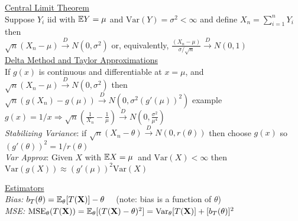 \documentclass[11pt]{article}
\newcommand{\Var}{\ensuremath{\mathrm{Var}}}
\newcommand{\Exp}{\Bbb{E}}
\begin{document}
\indent \underline{Central Limit Theorem}\\
\enlargethispage*{1000pt}
Suppose $Y_i$  iid with $\Exp Y = \mu$ and $\Var(Y) = \sigma^2 < \infty$ and define $X_n =
\sum_{i=1}^n Y_i$ then \\
%
$\sqrt{n}(X_n - \mu)\stackrel{D}{\longrightarrow} N(0,\sigma^2)$ or, equivalently,
$\frac{(X_n - \mu)}{\sigma /\sqrt{n}}\stackrel{D}{\longrightarrow} N(0,1)$  \\
%
\newpage
\indent\underline{Delta Method and Taylor Approximations}\\
If $g(x)$ is continuous and differentiable at $x=\mu$, and $\sqrt{n}(X_n - \mu)
\stackrel{D}{\longrightarrow} N(0,\sigma^2)$ then\\
%
$\sqrt{n}(g(X_n) - g(\mu))
\stackrel{D}{\longrightarrow} N(0,\sigma^2(g'(\mu))^2)$  example $g(x) = 1/x \Rightarrow
\sqrt{n}(\frac{1}{X_n} - \frac{1}{\mu})
\stackrel{D}{\longrightarrow} N(0,\frac{\sigma^2}{\mu^4})$\\
%
{\it Stabilizing Variance}: if $\sqrt{n}(X_n - \theta)
\stackrel{D}{\longrightarrow} N(0,r(\theta))$ then choose $g(x)$ so $(g'(\theta))^2 =
1/r(\theta)$\\
%
{\it Var Approx}:  Given $X$ with $\Exp X=\mu$\ and $\Var(X)<\infty$ then
$\Var(g(X))\approx (g'(\mu))^2 \Var(X)$

\indent\underline{Estimators}\\
{\it Bias:} $b_T(\theta) = \Exp_{\theta}[T(\mathbf{X})] -\theta$  \ \ (note: bias is a function
of
$\theta$)\\
{\it MSE:}  $\mathrm{MSE}_\theta (T(\mathbf{X})) = \Exp_{\theta}[(T(\mathbf{X}) - \theta)^2]
= \Var_{\theta}[T(\mathbf{X})] + [b_T(\theta)]^2$
\end{document}
